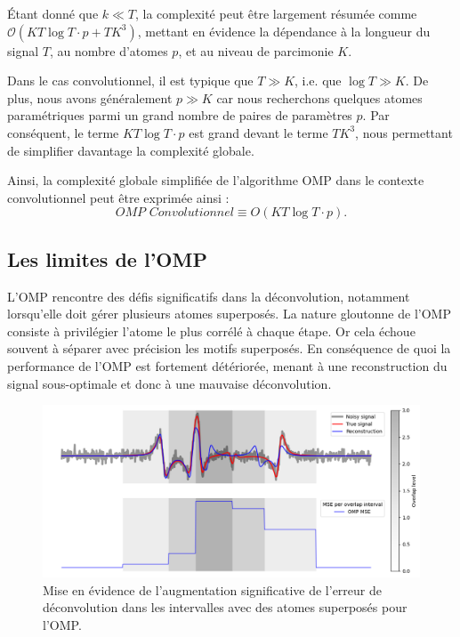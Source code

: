 \documentclass[9pt,a4paper,twoside]{rho}
\begin{document}
Étant donné que $k \ll T$, la complexité peut être largement résumée comme $\mathcal{O}(KT \log T \cdot p + TK^3)$, mettant en évidence la dépendance à la longueur du signal $T$, au nombre d'atomes $p$, et au niveau de parcimonie $K$.

Dans le cas convolutionnel, il est typique que $T \gg K$, i.e. que $\log T \gg K$. De plus, nous avons généralement $p \gg K$ car nous recherchons quelques atomes paramétriques parmi un grand nombre de paires de paramètres $p$. Par conséquent, le terme $KT \log T \cdot p$ est grand devant le terme $TK^3$, nous permettant de simplifier davantage la complexité globale.

Ainsi, la complexité globale simplifiée de l'algorithme OMP dans le contexte convolutionnel peut être exprimée ainsi :
\begin{equation}
    \textit{OMP Convolutionnel} \equiv O(KT \log T \cdot p).
\end{equation}


\subsection{Les limites de l'OMP}

L'OMP rencontre des défis significatifs dans la déconvolution, notamment lorsqu'elle doit gérer plusieurs atomes superposés. 
La nature gloutonne de l'OMP consiste à privilégier l'atome le plus corrélé à chaque étape. Or cela échoue souvent à séparer avec précision les motifs superposés.  
En conséquence de quoi la performance de l'OMP est fortement détériorée, menant à une reconstruction du signal sous-optimale et donc à une mauvaise déconvolution.

\begin{figure}[H]
    \centering
    \includegraphics[width=1\linewidth]{images/omp_overlap_mse.png}
    \caption{Mise en évidence de l'augmentation significative de l'erreur de déconvolution dans les intervalles avec des atomes superposés pour l'OMP.}
    \label{fig:omp_overlap}
\end{figure}
\end{document}

